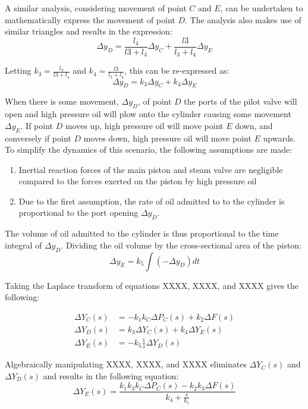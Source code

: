 A similar analysis, considering movement of point $C$ and $E$, can be undertaken to mathematically express the movement of point $D$. The analysis also makes use of similar triangles and results in the expression:
\begin{equation}
	\Delta y_D = \frac{l_4}{l3 + l_4} \Delta y_C + \frac{l3}{l_3 + l_4} \Delta y_E
\end{equation}

Letting $k_3 = \frac{l_4}{l3 + l_4}$ and $k_4 = \frac{l3}{l_3 + l_4}$, this can be re-expressed as:
\begin{equation}
	\Delta y_D = k_3 \Delta y_C + k_4 \Delta y_E
\end{equation}

When there is some movement, $\Delta y_D$, of point $D$ the ports of the pilot valve will open and high pressure oil will plow onto the cylinder causing some movement $\Delta y_E$. If point $D$ moves up, high pressure oil will move point $E$ down, and conversely if point $D$ moves down, high pressure oil will move point $E$ upwards. To simplify the dynamics of this scenario, the following assumptions are made:
\begin{enumerate}
	\item Inertial reaction forces of the main piston and steam valve are negligible compared to the forces exerted on the piston by high pressure oil
	\item Due to the first assumption, the rate of oil admitted to to the cylinder is proportional to the port opening $\Delta y_D$.
\end{enumerate}

The volume of oil admitted to the cylinder is thus proportional to the time integral of $\Delta y_D$. Dividing the oil volume by the cross-sectional area of the piston:
\begin{equation}
	\Delta y_E = k_5 \int (- \Delta y_D) dt
\end{equation}

Taking the Laplace transform of equations XXXX, XXXX, and XXXX gives the following:


\begin{align}
	\Delta Y_C(s) &= -k_1 k_C \Delta P_C(s) + k_2 \Delta F(s) \\
	\Delta Y_D(s) &= k_3 \Delta Y_C(s) + k_4 \Delta Y_E(s) \\
	\Delta Y_E(s) &= - k_5 \frac{1}{s} \Delta Y_D(s)
\end{align}

Algebraically manipulating XXXX, XXXX, and XXXX eliminates $\Delta Y_C(s)$ and $\Delta Y_D(s)$ and results in the following equation:
\begin{equation}
	\Delta Y_E(s) = \frac{k_1 k_3 k_C \Delta P_C(s) - k_2 k_3 \Delta F(s)}{k_4 + \frac{s}{k_5}}
\end{equation}


